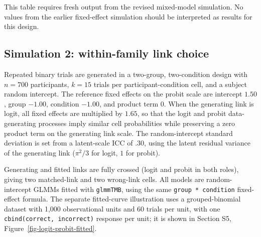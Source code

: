 \documentclass[
  man,
  floatsintext,
  longtable,
  nolmodern,
  notxfonts,
  notimes,
  colorlinks=true,linkcolor=blue,citecolor=blue,urlcolor=blue]{apa7}
\begin{document}
This table requires fresh output from the revised mixed-model
simulation. No values from the earlier fixed-effect simulation should be
interpreted as results for this design.

\subsection{Simulation 2: within-family link
choice}\label{simulation-2-within-family-link-choice}

Repeated binary trials are generated in a two-group, two-condition
design with \(n = 700\) participants, \(k = 15\) trials per
participant-condition cell, and a subject random intercept. The
reference fixed effects on the probit scale are intercept \(1.50\),
group \(-1.00\), condition \(-1.00\), and product term \(0\). When the
generating link is logit, all fixed effects are multiplied by \(1.65\),
so that the logit and probit data-generating processes imply similar
cell probabilities while preserving a zero product term on the
generating link scale. The random-intercept standard deviation is set
from a latent-scale ICC of \(.30\), using the latent residual variance
of the generating link (\(\pi^2/3\) for logit, \(1\) for probit).

Generating and fitted links are fully crossed (logit and probit in both
roles), giving two matched-link and two wrong-link cells. All models are
random-intercept GLMMs fitted with \texttt{glmmTMB}, using the same
\texttt{group\ *\ condition} fixed-effect formula. The separate
fitted-curve illustration uses a grouped-binomial dataset with 1,000
observational units and 60 trials per unit, with one
\texttt{cbind(correct,\ incorrect)} response per unit; it is shown in
Section S5, Figure~\ref{fig-logit-probit-fitted}.
\end{document}
